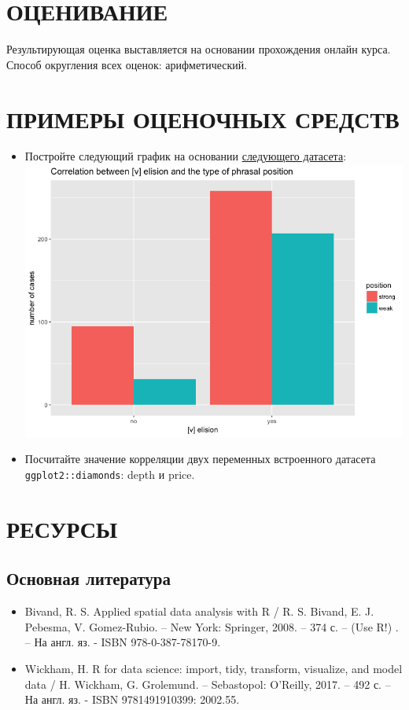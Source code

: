 \documentclass[a4paper]{article}
\begin{document}
\section{ОЦЕНИВАНИЕ}
Результирующая оценка выставляется на основании прохождения онлайн курса. Способ округления всех оценок: арифметический.
\section{ПРИМЕРЫ ОЦЕНОЧНЫХ СРЕДСТВ}
\begin{itemize}
\item Постройте следующий график на основании \href{https://tinyurl.com/y8oqsczd}{следующего датасета}:\\
\includegraphics[width=0.5\linewidth]{volition.png}
\item Посчитайте значение корреляции двух переменных встроенного датасета \texttt{ggplot2::diamonds}: depth и price.
\end{itemize}
\section{РЕСУРСЫ}
\subsection{Основная литература}
\begin{itemize}
\item   Bivand, R. S. Applied spatial data analysis with R / R. S. Bivand, E. J. Pebesma, V. Gomez-Rubio. – New York: Springer, 2008. – 374 с. – (Use R!) . – На англ. яз. - ISBN 978-0-387-78170-9. 
\item   Wickham, H.  R for data science: import, tidy, transform, visualize, and model data / H. Wickham, G. Grolemund. – Sebastopol: O'Reilly, 2017. – 492 с. – На англ. яз. - ISBN 9781491910399: 2002.55. 
\end{itemize} 
\end{document}
